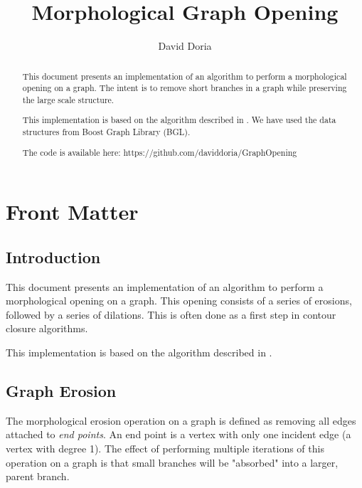 \documentclass{InsightArticle}
\title{Morphological Graph Opening}
\author{David Doria}
\newcommand{\IJhandlerIDnumber}{3250}
\begin{document}
\IJhandlefooter{\IJhandlerIDnumber}


\ifpdf
\else
\fi


\maketitle


\ifhtml
\chapter*{Front Matter\label{front}}
\fi

\begin{abstract}
\noindent

This document presents an implementation of an algorithm to perform a morphological opening on a graph. The intent is to remove short branches in a graph while preserving the large scale structure.

This implementation is based on the algorithm described in \cite{Sappa}. We have used the data structures from Boost Graph Library (BGL).

The code is available here:
https://github.com/daviddoria/GraphOpening

\end{abstract}

\IJhandlenote{\IJhandlerIDnumber}

\tableofcontents
\section{Introduction}
This document presents an implementation of an algorithm to perform a morphological opening on a graph. This opening consists of a series of erosions, followed by a series of dilations. This is often done as a first step in contour closure algorithms.

This implementation is based on the algorithm described in \cite{Sappa}.

\section{Graph Erosion}
The morphological erosion operation on a graph is defined as removing all edges attached to \emph{end points}. An end point is a vertex with only one incident edge (a vertex with degree 1). The effect of performing multiple iterations of this operation on a graph is that small branches will be "absorbed" into a larger, parent branch.
\end{document}
